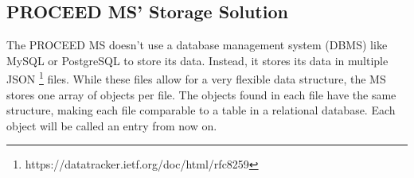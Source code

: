 %
%
%
%

\subsection{PROCEED MS' Storage Solution}
\label{cha:relatedwork:proceed-storage}

The PROCEED MS doesn't use a database management system (DBMS) like MySQL or PostgreSQL to store its data.
Instead, it stores its data in multiple
JSON \footnote{https://datatracker.ietf.org/doc/html/rfc8259} files.
While these files allow for a very flexible data structure, the MS stores one array of
objects per file.
The objects found in each file have the same structure, 
making each file comparable to a table in a relational database.
Each object will be called an entry from now on.

